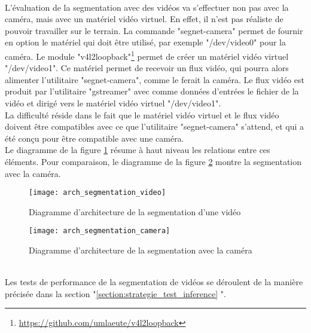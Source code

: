 ﻿
\vspace{0.5\baselineskip}
\\
\noindent L'évaluation de la segmentation avec des vidéos va s'effectuer non pas avec la caméra, mais avec un matériel vidéo virtuel. En effet, il n'est pas réaliste de pouvoir travailler sur le terrain. La commande "segnet-camera" permet de fournir en option le matériel qui doit être utilisé, par exemple "/dev/video0" pour la caméra. Le module "v4l2loopback"\footnote{\url{https://github.com/umlaeute/v4l2loopback}} permet de créer un matériel vidéo virtuel "/dev/video1". Ce matériel permet de recevoir un flux vidéo, qui pourra alors alimenter l'utilitaire "segnet-camera", comme le ferait la caméra. Le flux vidéo est produit par l'utilitaire "gstreamer" avec comme données d'entrées le fichier de la vidéo et dirigé vers le matériel vidéo virtuel "/dev/video1".
\vspace{0.5\baselineskip}
\\
\noindent La difficulté réside dans le fait que le matériel vidéo virtuel et le flux vidéo doivent être compatibles avec ce que l'utilitaire "segnet-camera" s'attend, et qui a été conçu pour être compatible avec une caméra. 
\vspace{0.5\baselineskip}
\\
\noindent Le diagramme de la figure \ref{fig:arch_segmentation_video} résume à haut niveau les relations entre ces éléments. Pour comparaison, le diagramme de la figure \ref{fig:arch_segmentation_camera} montre la segmentation avec la caméra. 
\begin{figure}[H]
    \centering
    \texttt{[image: arch\_segmentation\_video]}
    \caption[Diagramme d'architecture de la segmentation d'une vidéo]{Diagramme d'architecture de la segmentation d'une vidéo}
    \label{fig:arch_segmentation_video}
\end{figure}
\begin{figure}[H]
    \centering
    \texttt{[image: arch\_segmentation\_camera]}
    \caption[Diagramme d'architecture de la segmentation avec la caméra]{Diagramme d'architecture de la segmentation avec la caméra}
    \label{fig:arch_segmentation_camera}
\end{figure}
\vspace{0.5\baselineskip}
\\
\noindent Les tests de performance de la segmentation de vidéos se déroulent de la manière précisée dans la section "\ref{section:strategie_test_inference} ". 
